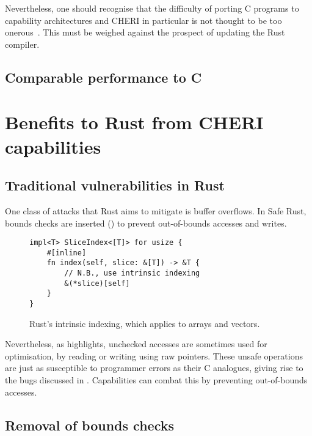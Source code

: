 \documentclass[dissertation.tex]{subfiles}
\begin{document}
Nevertheless, one should recognise that the difficulty of porting C
programs to capability architectures and CHERI in particular is not
thought to be too onerous~\cite{capsicum-usability}.
This must be weighed against the prospect of updating the Rust compiler.


\subsection{Comparable performance to C}


\section{Benefits to Rust from CHERI capabilities}
\label{sec:eval-rust}

\subsection{Traditional vulnerabilities in Rust}
\label{sec:eval-rust-vulns}

One class of attacks that Rust aims to mitigate is buffer overflows.
In Safe Rust, bounds checks are inserted ()
to prevent out-of-bounds accesses and writes.

\begin{figure}[ht]
\begin{lstlisting}
impl<T> SliceIndex<[T]> for usize {
    #[inline]
    fn index(self, slice: &[T]) -> &T {
        // N.B., use intrinsic indexing
        &(*slice)[self]
    }
}
\end{lstlisting}
\caption{ Rust's intrinsic indexing, which applies to
arrays and vectors.}
\label{lst:rust-index}
\end{figure}

Nevertheless, as  highlights, unchecked accesses
are sometimes used for optimisation, by reading or writing using raw
pointers.
These unsafe operations are just as susceptible to programmer errors as
their C analogues, giving rise to the bugs discussed in
.
Capabilities can combat this by preventing out-of-bounds accesses.


\subsection{Removal of bounds checks}
\label{sec:eval-rust-bounds}
\end{document}
